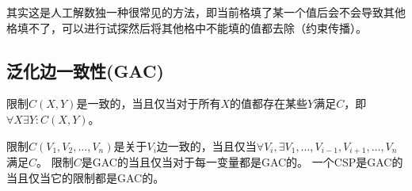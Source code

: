 其实这是人工解数独一种很常见的方法，即当前格填了某一个值后会不会导致其他格填不了，可以进行试探然后将其他格中不能填的值都去除（约束传播）。

\subsection{泛化边一致性(GAC)}
\begin{definition}[一致]
限制$C(X,Y)$是一致的，当且仅当对于所有$X$的值都存在某些$Y$满足$C$，即$\forall X\exists Y:C(X,Y)$。
\end{definition}
\begin{definition}
限制$C(V_1,V_2,\ldots,V_n)$是关于$V_i$边一致的，当且仅当$\forall V_i,\exists V_1,\ldots,V_{i-1},V_{i+1},\ldots,V_n$满足$C$。
限制$C$是GAC的当且仅当对于每一变量都是GAC的。
一个CSP是GAC的当且仅当它的限制都是GAC的。
\end{definition}

